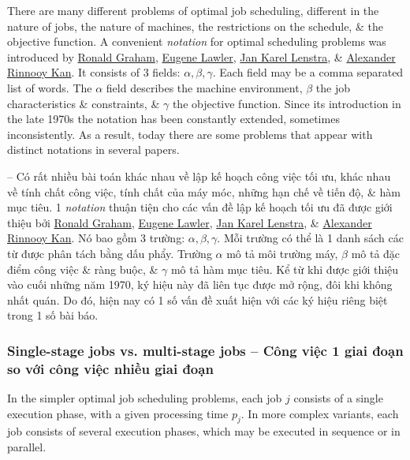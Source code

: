 \documentclass{article}
\begin{document}
There are many different problems of optimal job scheduling, different in the nature of jobs, the nature of machines, the restrictions on the schedule, \& the objective function. A convenient {\it notation} for optimal scheduling problems was introduced by \href{https://en.wikipedia.org/wiki/Ronald_Graham}{\sc Ronald Graham}, \href{https://en.wikipedia.org/wiki/Eugene_Lawler}{\sc Eugene Lawler}, \href{https://en.wikipedia.org/wiki/Jan_Karel_Lenstra}{\sc Jan Karel Lenstra}, \& \href{https://en.wikipedia.org/wiki/Alexander_Rinnooy_Kan}{\sc Alexander Rinnooy Kan}. It consists of 3 fields: $\alpha,\beta,\gamma$. Each field may be a comma separated list of words. The $\alpha$ field describes the machine environment, $\beta$ the job characteristics \& constraints, \& $\gamma$ the objective function. Since its introduction in the late 1970s the notation has been constantly extended, sometimes inconsistently. As a result, today there are some problems that appear with distinct notations in several papers.

-- Có rất nhiều bài toán khác nhau về lập kế hoạch công việc tối ưu, khác nhau về tính chất công việc, tính chất của máy móc, những hạn chế về tiến độ, \& hàm mục tiêu. 1 {\it notation} thuận tiện cho các vấn đề lập kế hoạch tối ưu đã được giới thiệu bởi \href{https://en.wikipedia.org/wiki/Ronald_Graham}{\sc Ronald Graham}, \href{https://en.wikipedia.org/wiki/Eugene_Lawler}{\sc Eugene Lawler}, \href{https://en.wikipedia.org/wiki/Jan_Karel_Lenstra}{\sc Jan Karel Lenstra}, \& \href{https://en.wikipedia.org/wiki/Alexander_Rinnooy_Kan}{\sc Alexander Rinnooy Kan}. Nó bao gồm 3 trường: $\alpha,\beta,\gamma$. Mỗi trường có thể là 1 danh sách các từ được phân tách bằng dấu phẩy. Trường $\alpha$ mô tả môi trường máy, $\beta$ mô tả đặc điểm công việc \& ràng buộc, \& $\gamma$ mô tả hàm mục tiêu. Kể từ khi được giới thiệu vào cuối những năm 1970, ký hiệu này đã liên tục được mở rộng, đôi khi không nhất quán. Do đó, hiện nay có 1 số vấn đề xuất hiện với các ký hiệu riêng biệt trong 1 số bài báo.


\subsubsection{Single-stage jobs vs. multi-stage jobs -- Công việc 1 giai đoạn so với công việc nhiều giai đoạn}
In the simpler optimal job scheduling problems, each job $j$ consists of a single execution phase, with a given processing time $p_j$. In more complex variants, each job consists of several execution phases, which may be executed in sequence or in parallel.
\end{document}
